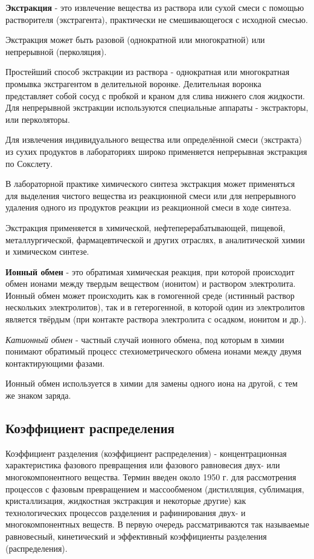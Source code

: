 \documentclass[14pt,a4paper]{scrartcl}
\begin{document}
\textbf{Экстракция} - это извлечение вещества из раствора или сухой смеси с помощью растворителя (экстрагента), практически не смешивающегося с исходной смесью.

Экстракция может быть разовой (однократной или многократной) или непрерывной (перколяция).

Простейший способ экстракции из раствора - однократная или многократная промывка экстрагентом в делительной воронке. Делительная воронка представляет собой сосуд с пробкой и краном для слива нижнего слоя жидкости. Для непрерывной экстракции используются специальные аппараты - экстракторы, или перколяторы.

Для извлечения индивидуального вещества или определённой смеси (экстракта) из сухих продуктов в лабораториях широко применяется непрерывная экстракция по Сокслету.

В лабораторной практике химического синтеза экстракция может применяться для выделения чистого вещества из реакционной смеси или для непрерывного удаления одного из продуктов реакции из реакционной смеси в ходе синтеза.

Экстракция применяется в химической, нефтеперерабатывающей, пищевой, металлургической, фармацевтической и других отраслях, в аналитической химии и химическом синтезе.

\textbf{Ионный обмен} - это обратимая химическая реакция, при которой происходит обмен ионами между твердым веществом (ионитом) и раствором электролита. Ионный обмен может происходить как в гомогенной среде (истинный раствор нескольких электролитов), так и в гетерогенной, в которой один из электролитов является твёрдым (при контакте раствора электролита с осадком, ионитом и др.).

\emph{Катионный обмен} - частный случай ионного обмена, под которым в химии понимают обратимый процесс стехиометрического обмена ионами между двумя контактирующими фазами.

Ионный обмен используется в химии для замены одного иона на другой, с тем же знаком заряда.
\subsection*{Коэффициент распределения}

Коэффициент разделения (коэффициент распределения) - концентрационная характеристика фазового превращения или фазового равновесия двух- или многокомпонентного вещества. Термин введен около 1950 г. для рассмотрения процессов с фазовым превращением и массообменом (дистилляция, сублимация, кристаллизация, жидкостная экстракция и некоторые другие) как технологических процессов разделения и рафинирования двух- и многокомпонентных веществ. В первую очередь рассматриваются так называемые равновесный, кинетический и эффективный коэффициенты разделения (распределения).
\end{document}

